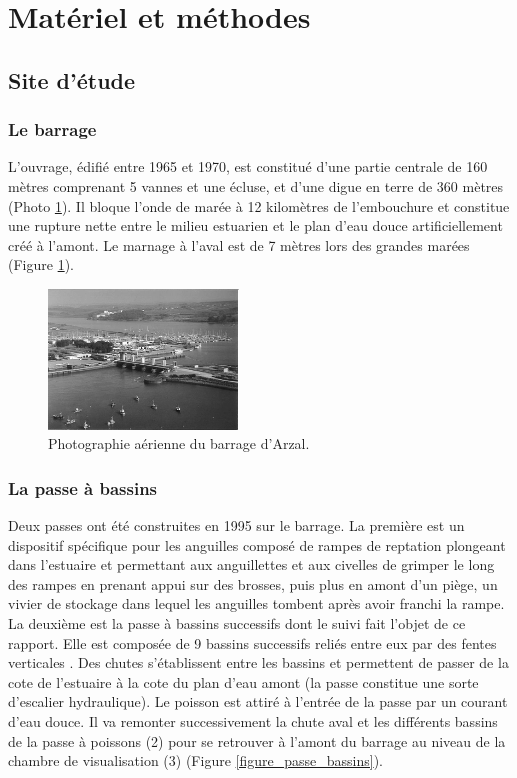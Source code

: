 \documentclass[11pt,twocolumn,titlepage,twoside]{article}\usepackage[]{graphicx}\usepackage[]{color}
\begin{document}
   
    
\section{Matériel et méthodes}

\subsection{Site d'étude}
\subsubsection{Le barrage}

L’ouvrage, édifié entre 1965 et 1970, est constitué d’une partie centrale de 160 mètres comprenant 5 vannes 
et une écluse, et d’une digue en terre de 360 mètres (Photo
\ref{photo_barrage}).
Il bloque l’onde de marée à 12 kilomètres de l’embouchure et constitue une rupture nette entre le milieu estuarien 
et le plan d’eau douce artificiellement créé à l’amont. 
Le marnage à l’aval est de 7 mètres lors des grandes marées (Figure
\ref{photo_barrage}).

\begin{figure}[htpb]
\centering
\includegraphics[width=0.45\textwidth]{barrage.png}
\caption{Photographie aérienne du barrage d'Arzal.
}
\label{photo_barrage}
\end{figure}


\subsubsection{La passe à bassins}

Deux passes ont été construites en 1995 sur le barrage. La première est un
dispositif spécifique pour les anguilles composé de rampes de reptation plongeant dans l'estuaire et
permettant aux anguillettes et aux civelles de grimper le long des rampes en
prenant appui sur des brosses, puis plus en amont d'un piège, un vivier de
stockage dans lequel les anguilles tombent après avoir franchi la rampe.
La deuxième est la passe à bassins successifs dont le suivi fait l'objet de ce
rapport.
Elle est composée de 9 bassins successifs reliés entre eux par des fentes
verticales \citep{larinier_passes_1999}.
Des chutes s’établissent entre les bassins et permettent de passer de la cote de l’estuaire à la cote du plan d’eau amont
(la passe constitue une sorte d’escalier hydraulique). Le poisson est attiré à
l’entrée de la passe par un courant d’eau douce. Il va remonter successivement
la chute aval et les différents bassins de la passe à poissons (2) pour se
retrouver à l’amont du barrage au niveau de la
chambre de visualisation (3) (Figure \ref{figure_passe_bassins}).
\end{document}
